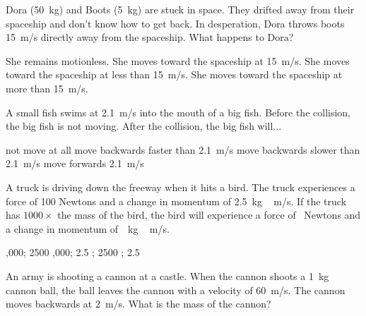 \documentclass[answers]{exam}
\begin{document}
\begin{questions}
\question
Dora (\SI{50}{kg}) and Boots (\SI{5}{kg}) are stuck in space.  They drifted away from their spaceship and don’t know how to get back.  In desperation, Dora throws boots \SI{15}{m/s} directly away from the spaceship. What happens to Dora?

\begin{randomizechoices}[norandomize]
    \choice She remains motionless.
    \choice She moves toward the spaceship at \SI{15}{m/s}.
    \correctchoice She moves toward the spaceship at less than \SI{15}{m/s}.
    \choice She moves toward the spaceship at more than \SI{15}{m/s}.
\end{randomizechoices}

\question
A small fish swims at \SI{2.1}{m/s} into the mouth of a big fish.  Before the collision, the big fish is not moving.  After the collision, the big fish will...
\vspace{-1em}

\begin{center}
\end{center}

\begin{randomizechoices}[norandomize]
    \choice not move at all
    \choice move backwards faster than \SI{2.1}{m/s}
    \correctchoice move backwards slower than \SI{2.1}{m/s}
    \choice move forwards \SI{2.1}{m/s}
\end{randomizechoices}

\clearpage

\question
A truck is driving down the freeway when it hits a bird. The truck experiences a force of 100 Newtons and a change in momentum of \SI{2.5}{kg\,m/s}. If the truck has $1000\times$ the mass of the bird, the bird will experience a force of \fillin\ Newtons and a change in momentum of \fillin\,\SI{}{kg\,m/s}.

\begin{randomizechoices}[norandomize]
    ,000; 2500
    ,000; 2.5
    ; 2500
    ; 2.5
\end{randomizechoices}

\question
An army is shooting a cannon at a castle. When the cannon shoots a \SI{1}{kg} cannon ball, the ball leaves the cannon with a velocity of \SI{60}{m/s}. The cannon moves backwards at \SI{2}{m/s}. What is the mass of the cannon?


\end{questions}
\end{document}
